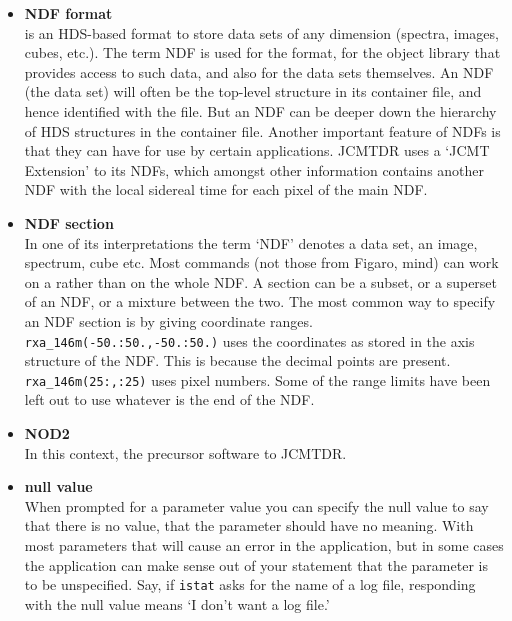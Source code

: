 \begin{itemize}
\item{\bf \label{glossndf}NDF format}\\
   is an HDS-based format to store
   data sets of any dimension (spectra, images, cubes, etc.). The term
   NDF is used for the format, for the object library that provides
   access to such data, and also for the data sets themselves. An NDF
   (the data set) will often be the top-level structure in its container
   file, and hence identified with the file. But an NDF can be deeper
   down the hierarchy of HDS structures in the container file. Another
   important feature of NDFs is that they can have
   for use by certain applications. JCMTDR uses a `JCMT Extension' to its
   NDFs, which amongst other information contains another NDF with the
   local sidereal time for each pixel of the main NDF.

\item{\bf \label{glossndfsection}NDF section}\\
   In one of its interpretations
   the term `NDF' denotes a data set, an image, spectrum, cube etc.
   Most commands (not those from Figaro, mind) can work on a
   rather than on the whole NDF. A section can be a subset, or a
   superset of an NDF, or a mixture between the two. The most common way
   to specify an NDF section is by giving coordinate ranges.
   {\tt rxa\_146m(-50.:50.,-50.:50.)} uses the coordinates as stored
   in the axis structure of the NDF. This is because the decimal points
   are present. {\tt rxa\_146m(25:,:25)} uses pixel numbers. Some of
   the range limits have been left out to use whatever is the end of the
   NDF.

\item{\bf \label{glossnod2}NOD2}\\
   In this context, the precursor software to
   JCMTDR.

\item{\bf \label{glossnullvalue}null value}\\
   When prompted for a parameter
   value you can specify the null value to say that there is no value,
   that the parameter should have no meaning. With most parameters that
   will cause an error in the application, but in some cases the
   application can make sense out of your statement that the parameter
   is to be unspecified. Say, if {\tt istat} asks for the name of a log
   file, responding with the null value means `I don't want a log file.'


\end{itemize}

